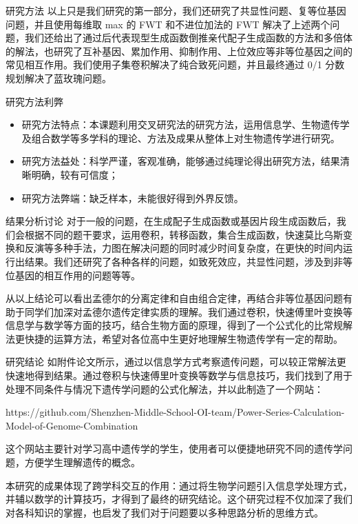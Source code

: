 \documentclass{beamer}
\begin{document}
	\begin{frame}{研究方法}
		以上只是我们研究的第一部分，我们还研究了共显性问题、复等位基因问题，并且使用每维取 max 的 FWT 和不进位加法的 FWT 解决了上述两个问题，我们还给出了通过后代表现型生成函数倒推亲代配子生成函数的方法和多倍体的解法，也研究了互补基因、累加作用、抑制作用、上位效应等非等位基因之间的常见相互作用。我们使用子集卷积解决了纯合致死问题，并且最终通过 0/1 分数规划解决了蓝玫瑰问题。
	\end{frame}
	
	\begin{frame}{研究方法利弊}
		\begin{itemize}
			\item 研究方法特点：本课题利用交叉研究法的研究方法，运用信息学、生物遗传学及组合数学等多学科的理论、方法及成果从整体上对生物遗传学进行研究。
			\item 研究方法益处：科学严谨，客观准确，能够通过纯理论得出研究方法，结果清晰明确，较有可信度；
			\item 研究方法弊端：缺乏样本，未能很好得到外界反馈。
		\end{itemize}
	\end{frame}

	\begin{frame}{结果分析讨论}
		对于一般的问题，在生成配子生成函数或基因片段生成函数后，我们会根据不同的题干要求，运用卷积，转移函数，集合生成函数，快速莫比乌斯变换和反演等多种手法，力图在解决问题的同时减少时间复杂度，在更快的时间内运行出结果。我们还研究了各种各样的问题，如致死效应，共显性问题，涉及到非等位基因的相互作用的问题等等。
		
		从以上结论可以看出孟德尔的分离定律和自由组合定律，再结合非等位基因问题有助于同学们加深对孟德尔遗传定律实质的理解。我们通过卷积，快速傅里叶变换等信息学与数学等方面的技巧，结合生物方面的原理，得到了一个公式化的比常规解法更快捷的运算方法，希望对各位高中生更好地理解生物遗传学有一定的帮助。
	\end{frame}

	\begin{frame}{研究结论}
		如附件论文所示，通过以信息学方式考察遗传问题，可以较正常解法更快速地得到结果。通过卷积与快速傅里叶变换等数学与信息技巧，我们找到了用于处理不同条件与情况下遗传学问题的公式化解法，并以此制造了一个网站：
		
		https://github.com/Shenzhen-Middle-School-OI-team/Power-Series-Calculation-Model-of-Genome-Combination
		
		这个网站主要针对学习高中遗传学的学生，使用者可以便捷地研究不同的遗传学问题，方便学生理解遗传的概念。
		
		本研究的成果体现了跨学科交互的作用：通过将生物学问题引入信息学处理方式，并辅以数学的计算技巧，才得到了最终的研究结论。这个研究过程不仅加深了我们对各科知识的掌握，也启发了我们对于问题要以多种思路分析的思维方式。
	\end{frame}
	
\end{document}
